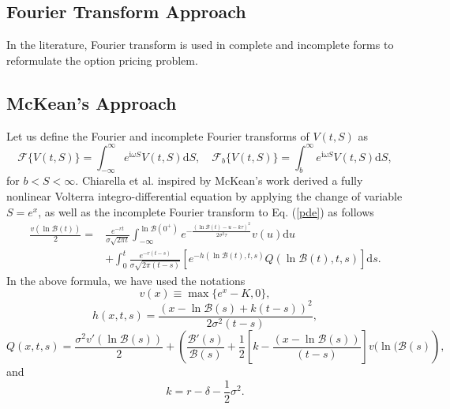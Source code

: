 \documentclass[fleqn,final,3p,11pt]{elsarticle}
\theoremstyle{definition}
\theoremstyle{remark}
\numberwithin{equation}{section}
\def\im{\mathrm{i}}
\begin{document}
\begin{appendices}
\section{Fourier Transform Approach}\label{forieh}
In the literature, Fourier transform is used in complete  and incomplete forms to reformulate  the option pricing problem.
\subsection{McKean's Approach}
 Let us define the Fourier and incomplete Fourier  transforms of $V(t, S)$ as
\begin{equation}\mathcal{F}\{V(t, S) \} = \int_{-\infty}^{\infty}e^{\im\omega S} V(t, S) \mathrm{d}S, \quad \mathcal{F}_{b}\{V(t, S)\} = \int_{b}^{\infty}e^{\im\omega S} V(t, S) \mathrm{d}S, \end{equation}
for $b<S<\infty$.  Chiarella et al. \cite{chiarella2014numerical, chia} inspired by McKean's work  \cite{kean} derived a fully nonlinear Volterra integro-differential equation by applying  the change of variable $S = e^{x}$, as well as the incomplete Fourier transform to Eq. (\ref{pde}) as follows
\begin{equation}\label{aa1}
\begin{split}
\frac{v(\ln \mathcal{B}(t))}{2}  = & \frac{e^{-rt}}{\sigma \sqrt{2 \pi t}}\int_{-\infty}^{\ln \mathcal{B}(0^{+})} e^{-\frac{(\ln \mathcal{B}(t) -u-k\tau)^{2}}{2 \sigma^{2}\tau}} v(u)\mathrm{d}u \\
 & +  \int_{0}^{t} \frac{e^{-r(t-s)}}{\sigma \sqrt{ 2 \pi (t-s)}} \left[ e^{-h(\ln \mathcal{B}(t), t, s)} Q(\ln \mathcal{B}(t),t, s) \right] \mathrm{d}s.
\end{split}
\end{equation}
In the above formula, we have used the notations
 \[ v(x)\equiv \max \{ e^{x} -K, 0 \}, \]
\[ h(x, t, s) = \frac{(x - \ln \mathcal{B}(s) + k(t-s))^{2}}{2 \sigma^{2}(t-s)},\]
\[ Q(x,t,  s) = \frac{\sigma^{2} v' (\ln \mathcal{B}(s))}{2} + \left(
\frac{\mathcal{B}'(s)}{\mathcal{B}(s)} + \frac{1}{2} \left[ k - \frac{(x- \ln \mathcal{B}(s))}{(t-s)} \right]  v(\ln (\mathcal{B}(s) \right),
\]
and
\[k = r - \delta - \frac{1}{2} \sigma^{2}.\]

\end{appendices}
\end{document}
